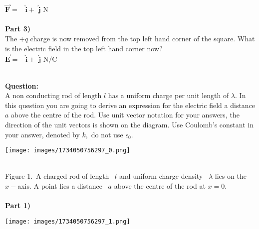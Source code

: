 \documentclass[addpoints,12pt, margin-left=35px]{exam}
\begin{document}
$\mathbf{\vec{F}} = $  \underline{\hspace{3cm}}  $ \mathbf{\hat{i}} + $  \underline{\hspace{3cm}}  $\mathbf{\hat{j}} \text{ N}$ \\

\\

\textbf{Part 3)}\\

The $+q$ charge is now removed from the top left hand corner of the square. What is the electric field in the top left hand corner now?\\

$\mathbf{\vec{E}} = $  \underline{\hspace{3cm}}  $ \mathbf{\hat{i}} + $  \underline{\hspace{3cm}}  $\mathbf{\hat{j}} \text{ N/C}$ \\

\\

\newpage

\textbf{Question:}\\

A non conducting rod of length $l $ has a uniform charge per unit length of $\lambda $. In this question you are going to derive an expression for the electric field a distance $a$ above the centre of the rod. Use unit vector notation for your answers, the direction of the unit vectors is shown on the diagram. Use Coulomb's constant in your answer, denoted by $k,$ do not use $\epsilon_0.$\\

\begin{center}
\texttt{[image: images/1734050756297\_0.png]}
\end{center}\\

Figure 1. A charged rod of length  $ l $ and uniform charge density  $ \lambda $ lies on the  $ x-$axis. A point lies a distance  $ a $ above the centre of the rod at $ x= 0 $.\\

 \\

\textbf{Part 1)}\\

\begin{center}
\texttt{[image: images/1734050756297\_1.png]}
\end{center}\\
\end{document}
